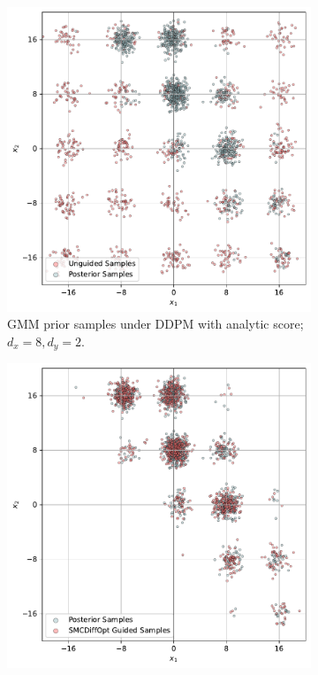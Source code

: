 \begin{figure}[htbp]
    \centering
    \begin{subfigure}[b]{0.48\textwidth}
      \centering
      \includegraphics[width=\textwidth]{assets/gmm_prior_samples.pdf}
      \caption{GMM prior samples under DDPM with analytic score; $d_x = 8, d_y = 2$.}
      \label{fig:gmm-prior}
    \end{subfigure}
    \hfill
    \begin{subfigure}[b]{0.48\textwidth}
      \centering
      \includegraphics[width=\textwidth]{assets/gmm_smc_samples.pdf}

\end{subfigure}
\end{figure}
